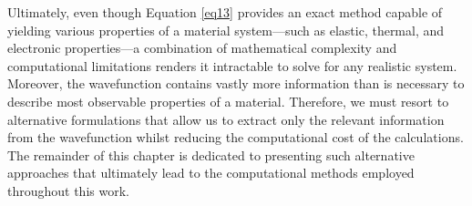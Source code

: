 Ultimately, even though Equation \ref{eq13} provides an exact method capable of yielding various properties of a material system---such as elastic, thermal, and electronic properties---a combination of mathematical complexity and computational limitations renders it intractable to solve for any realistic system. Moreover, the wavefunction contains vastly more information than is necessary to describe most observable properties of a material. Therefore, we must resort to alternative formulations that allow us to extract only the relevant information from the wavefunction whilst reducing the computational cost of the calculations. The remainder of this chapter is dedicated to presenting such alternative approaches that ultimately lead to the computational methods employed throughout this work.

